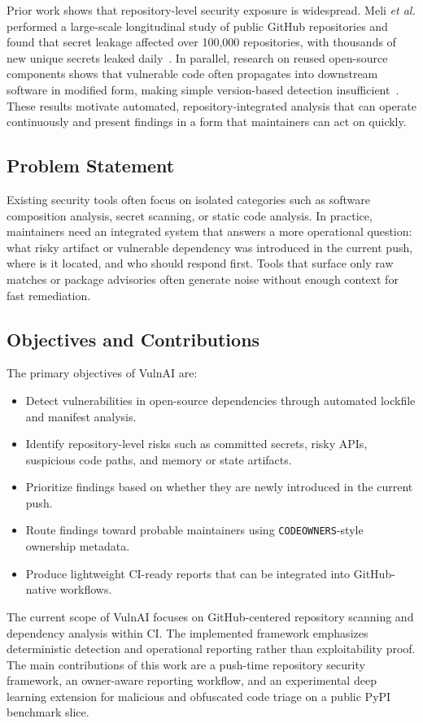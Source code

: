 \documentclass[conference]{IEEEtran}
\begin{document}
Prior work shows that repository-level security exposure is widespread. Meli \emph{et al.} performed a large-scale longitudinal study of public GitHub repositories and found that secret leakage affected over 100{,}000 repositories, with thousands of new unique secrets leaked daily~\cite{meli2019how}. In parallel, research on reused open-source components shows that vulnerable code often propagates into downstream software in modified form, making simple version-based detection insufficient~\cite{woo2022movery,woo2023v1scan}. These results motivate automated, repository-integrated analysis that can operate continuously and present findings in a form that maintainers can act on quickly.

\subsection{Problem Statement}
Existing security tools often focus on isolated categories such as software composition analysis, secret scanning, or static code analysis. In practice, maintainers need an integrated system that answers a more operational question: what risky artifact or vulnerable dependency was introduced in the current push, where is it located, and who should respond first. Tools that surface only raw matches or package advisories often generate noise without enough context for fast remediation.

\subsection{Objectives and Contributions}
The primary objectives of VulnAI are:
\begin{itemize}
\item Detect vulnerabilities in open-source dependencies through automated lockfile and manifest analysis.
\item Identify repository-level risks such as committed secrets, risky APIs, suspicious code paths, and memory or state artifacts.
\item Prioritize findings based on whether they are newly introduced in the current push.
\item Route findings toward probable maintainers using \texttt{CODEOWNERS}-style ownership metadata.
\item Produce lightweight CI-ready reports that can be integrated into GitHub-native workflows.
\end{itemize}

The current scope of VulnAI focuses on GitHub-centered repository scanning and dependency analysis within CI. The implemented framework emphasizes deterministic detection and operational reporting rather than exploitability proof. The main contributions of this work are a push-time repository security framework, an owner-aware reporting workflow, and an experimental deep learning extension for malicious and obfuscated code triage on a public PyPI benchmark slice.
\end{document}

